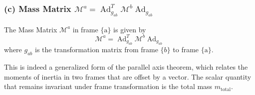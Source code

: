 \subsubsection*{(c) Mass Matrix \( \mathcal{M}^{a}=\operatorname{Ad}_{g_{a b}}^{T} \mathcal{M}^{b} \operatorname{Ad}_{g_{a b}} \)}

The Mass Matrix \( \mathcal{M}^{a} \) in frame \( \{\mathrm{a}\} \) is given by
\begin{equation}
    \mathcal{M}^{a}=\operatorname{Ad}_{g_{a b}}^{T} \mathcal{M}^{b} \operatorname{Ad}_{g_{a b}}
\end{equation}
where \( g_{a b} \) is the transformation matrix from frame \( \{b\} \) to frame \( \{\mathrm{a}\} \).

This is indeed a generalized form of the parallel axis theorem, which relates the moments of inertia in two frames that are offset by a vector.
The scalar quantity that remains invariant under frame transformation is the total mass \( m_{\text{total}} \).
